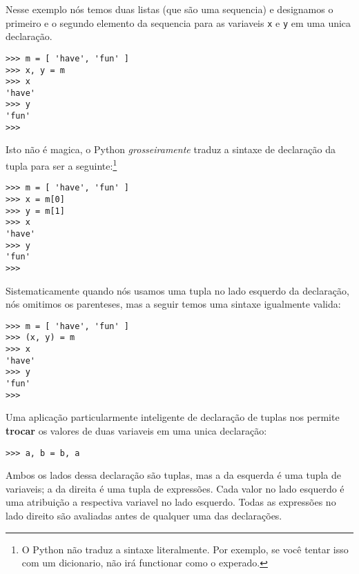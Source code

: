 Nesse exemplo nós temos duas listas (que são uma sequencia) e
designamos o primeiro e o segundo elemento da sequencia para as
variaveis {\tt x} e {\tt y} em uma unica declaração.

\beforeverb
\begin{verbatim}
>>> m = [ 'have', 'fun' ]
>>> x, y = m
>>> x
'have'
>>> y
'fun'
>>> 
\end{verbatim}
\afterverb
%
Isto não é magica, o Python \emph{grosseiramente} traduz a
sintaxe de declaração da tupla
para ser a seguinte:\footnote{O Python não traduz a sintaxe
literalmente. Por exemplo, se você tentar isso com um dicionario, não
irá functionar como o experado.}

\beforeverb
\begin{verbatim}
>>> m = [ 'have', 'fun' ]
>>> x = m[0]
>>> y = m[1]
>>> x
'have'
>>> y
'fun'
>>> 
\end{verbatim}
\afterverb

Sistematicamente quando nós usamos uma tupla no lado esquerdo da
declaração, nós omitimos os parenteses, mas a seguir temos uma sintaxe
igualmente valida:

\beforeverb
\begin{verbatim}
>>> m = [ 'have', 'fun' ]
>>> (x, y) = m
>>> x
'have'
>>> y
'fun'
>>> 
\end{verbatim}
\afterverb
%
Uma aplicação particularmente inteligente de declaração de tuplas 
nos permite {\bf trocar} os valores de duas variaveis em uma unica declaração:

\beforeverb
\begin{verbatim}
>>> a, b = b, a
\end{verbatim}
\afterverb
%
Ambos os lados dessa declaração são tuplas, mas
a da esquerda é uma tupla de variaveis; a da direita é uma tupla de
expressões. Cada valor no lado esquerdo
é uma atribuição a respectiva variavel no lado esquerdo.
Todas as expressões no lado direito são avaliadas antes de qualquer
uma das declarações.


